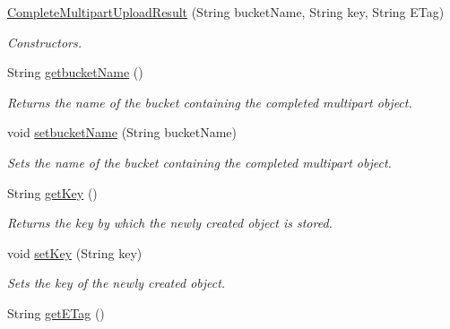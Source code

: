 \begin{DoxyCompactItemize}
\item 
\hyperlink{classorg_1_1jcs_1_1dss_1_1main_1_1CompleteMultipartUploadResult_ab9548432e5f0d7f277e591ef842cd4fc}{Complete\+Multipart\+Upload\+Result} (String bucket\+Name, String key, String E\+Tag)\hypertarget{classorg_1_1jcs_1_1dss_1_1main_1_1CompleteMultipartUploadResult_ab9548432e5f0d7f277e591ef842cd4fc}{}\label{classorg_1_1jcs_1_1dss_1_1main_1_1CompleteMultipartUploadResult_ab9548432e5f0d7f277e591ef842cd4fc}

\begin{DoxyCompactList}\small\item\em Constructors. \end{DoxyCompactList}\item 
String \hyperlink{classorg_1_1jcs_1_1dss_1_1main_1_1CompleteMultipartUploadResult_ad86c5010ae0b82f2edbe07cad0d48a1d}{getbucket\+Name} ()
\begin{DoxyCompactList}\small\item\em Returns the name of the bucket containing the completed multipart object. \end{DoxyCompactList}\item 
void \hyperlink{classorg_1_1jcs_1_1dss_1_1main_1_1CompleteMultipartUploadResult_a641a5baf4a0db2e0ae3ee547507cbd0d}{setbucket\+Name} (String bucket\+Name)
\begin{DoxyCompactList}\small\item\em Sets the name of the bucket containing the completed multipart object. \end{DoxyCompactList}\item 
String \hyperlink{classorg_1_1jcs_1_1dss_1_1main_1_1CompleteMultipartUploadResult_aaf784bdb0a8038dbe369badc6da36398}{get\+Key} ()
\begin{DoxyCompactList}\small\item\em Returns the key by which the newly created object is stored. \end{DoxyCompactList}\item 
void \hyperlink{classorg_1_1jcs_1_1dss_1_1main_1_1CompleteMultipartUploadResult_a1bc12b45a01fd32bcdd6ae7f28e05f4b}{set\+Key} (String key)
\begin{DoxyCompactList}\small\item\em Sets the key of the newly created object. \end{DoxyCompactList}\item 
String \hyperlink{classorg_1_1jcs_1_1dss_1_1main_1_1CompleteMultipartUploadResult_af3497d238806aafd9edb5151795592d8}{get\+E\+Tag} ()

\end{DoxyCompactItemize}
